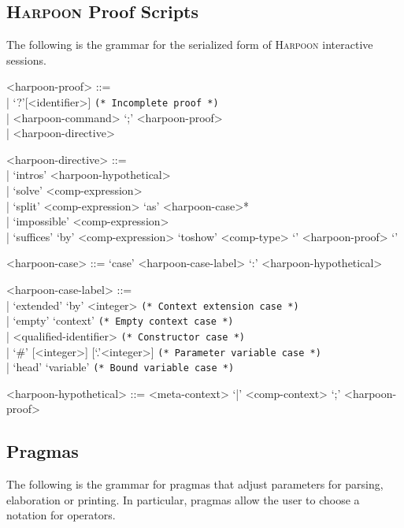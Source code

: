 \documentclass[11pt]{article}
\newcommand{\Harpoon}{\textsc{Harpoon}\xspace}
\begin{document}
\subsection{\Harpoon Proof Scripts}\label{section:syntax-harpoon-proof-scripts}

The following is the grammar for the serialized form of \Harpoon interactive sessions.

\begin{grammar}
<harpoon-proof> ::= \hfill\\
| `?'[<identifier>] \hfill \texttt{(* Incomplete proof *)}\\
| <harpoon-command> `;' <harpoon-proof>\\
| <harpoon-directive>


<harpoon-directive> ::= \hfill\\
| `intros' <harpoon-hypothetical>\\
| `solve' <comp-expression>\\
| `split' <comp-expression> `as' <harpoon-case>*\\
| `impossible' <comp-expression>\\
| `suffices' `by' <comp-expression> `toshow' <comp-type> `{' <harpoon-proof> `}'

<harpoon-case> ::= `case' <harpoon-case-label> `:' <harpoon-hypothetical>

<harpoon-case-label> ::= \hfill\\
| `extended' `by' <integer> \hfill \texttt{(* Context extension case *)}\\
| `empty' `context' \hfill \texttt{(* Empty context case *)}\\
| <qualified-identifier> \hfill \texttt{(* Constructor case *)}\\
| `#' [<integer>] [`.'<integer>] \hfill \texttt{(* Parameter variable case *)}\\
| `head' `variable' \hfill \texttt{(* Bound variable case *)}

<harpoon-hypothetical> ::= <meta-context> `|' <comp-context> `;' <harpoon-proof>
\end{grammar}

\subsection{Pragmas}\label{section:syntax-pragmas}

The following is the grammar for pragmas that adjust parameters for parsing, elaboration or printing.
In particular, pragmas allow the user to choose a notation for operators.
\end{document}
